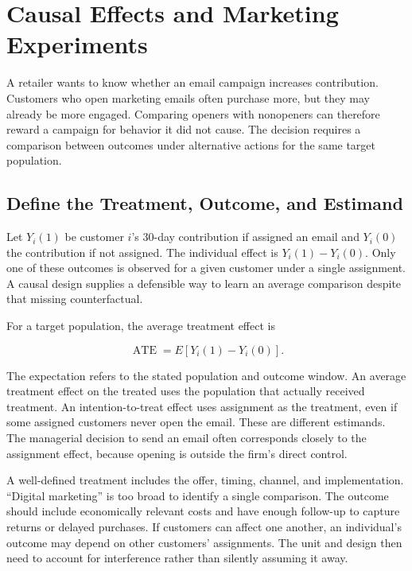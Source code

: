 \hypertarget{M06-m6.-causal-effects-and-marketing-experiments}{%
\chapter{Causal Effects and Marketing
Experiments}\label{M06-m6.-causal-effects-and-marketing-experiments}}

\noindent A retailer wants to know whether an email campaign increases
contribution. Customers who open marketing emails often purchase more,
but they may already be more engaged. Comparing openers with nonopeners
can therefore reward a campaign for behavior it did not cause. The
decision requires a comparison between outcomes under alternative
actions for the same target population.

\hypertarget{M06-define-the-treatment-outcome-and-estimand}{%
\section{Define the Treatment, Outcome, and
Estimand}\label{M06-define-the-treatment-outcome-and-estimand}}

\noindent Let \(Y_i(1)\) be customer \(i\)'s 30-day contribution if assigned an
email and \(Y_i(0)\) the contribution if not assigned. The individual
effect is \(Y_i(1)-Y_i(0)\). Only one of these outcomes is observed for
a given customer under a single assignment. A causal design supplies a
defensible way to learn an average comparison despite that missing
counterfactual.

For a target population, the average treatment effect is

\[
\operatorname{ATE}=E[Y_i(1)-Y_i(0)].
\]

The expectation refers to the stated population and outcome window. An
average treatment effect on the treated uses the population that
actually received treatment. An intention-to-treat effect uses
assignment as the treatment, even if some assigned customers never open
the email. These are different estimands. The managerial decision to
send an email often corresponds closely to the assignment effect,
because opening is outside the firm's direct control.

A well-defined treatment includes the offer, timing, channel, and
implementation. ``Digital marketing'' is too broad to identify a single
comparison. The outcome should include economically relevant costs and
have enough follow-up to capture returns or delayed purchases. If
customers can affect one another, an individual's outcome may depend on
other customers' assignments. The unit and design then need to account
for interference rather than silently assuming it away.

